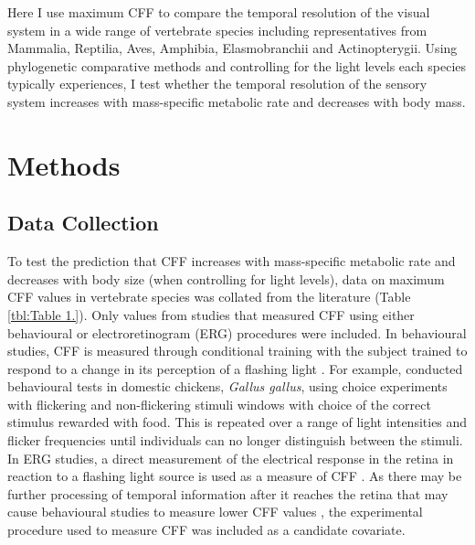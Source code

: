Here I use maximum CFF to compare the temporal resolution of the visual system in a wide range of vertebrate species including representatives from Mammalia, Reptilia, Aves, Amphibia, Elasmobranchii and Actinopterygii. Using phylogenetic comparative methods and controlling for the light levels each species typically experiences, I test whether the temporal resolution of the sensory system increases with mass-specific metabolic rate and decreases with body mass.

\section{Methods}
\subsection{Data Collection}
To test the prediction that CFF increases with mass-specific metabolic rate and decreases with body size (when controlling for light levels), data on maximum CFF values in vertebrate species was collated from the literature (Table \ref{tbl:Table 1.}). Only values from studies that measured CFF using either behavioural or electroretinogram (ERG) procedures were included. In behavioural studies, CFF is measured through conditional training with the subject trained to respond to a change in its perception of a flashing light \citep{d1998can,rubene2010presence}. For example, \citep{lisney2011behavioural} conducted behavioural tests in domestic chickens, \textit{Gallus gallus}, using choice experiments with flickering and non-flickering stimuli windows with choice of the correct stimulus rewarded with food. This is repeated over a range of light intensities and flicker frequencies until individuals can no longer distinguish between the stimuli. In ERG studies, a direct measurement of the electrical response in the retina in reaction to a flashing light source is used as a measure of CFF \citep{d1998can,schwartz2010visual}. As there may be further processing of temporal information after it reaches the retina that may cause behavioural studies to measure lower CFF values \citep{d1998can}, the experimental procedure used to measure CFF was included as a candidate covariate. 

